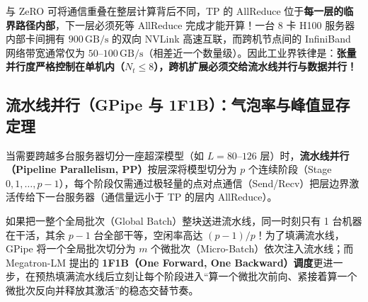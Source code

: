 \begin{remark}
与 ZeRO 可将通信重叠在整层计算背后不同，TP 的 AllReduce 位于\textbf{每一层的临界路径内部}，下一层必须死等 AllReduce 完成才能开算！一台 8 卡 H100 服务器内部卡间拥有 $900\,\mathrm{GB/s}$ 的双向 NVLink 高速互联，而跨机节点间的 InfiniBand 网络带宽通常仅为 $50\text{--}100\,\mathrm{GB/s}$（相差近一个数量级）。因此工业界铁律是：\textbf{张量并行度严格控制在单机内（$N_t \le 8$），跨机扩展必须交给流水线并行与数据并行！}
\end{remark}

\subsection{流水线并行（GPipe 与 1F1B）：气泡率与峰值显存定理}
\label{subsec:pipeline-parallel}

当需要跨越多台服务器切分一座超深模型（如 $L = 80\text{--}126$ 层）时，\textbf{流水线并行（Pipeline Parallelism, PP）}按层深将模型切分为 $p$ 个连续阶段（Stage $0, 1, \dots, p-1$），每个阶段仅需通过极轻量的点对点通信（Send/Recv）把层边界激活传给下一台服务器（通信量远小于 TP 的层内 AllReduce）。

如果把一整个全局批次（Global Batch）整块送进流水线，同一时刻只有 1 台机器在干活，其余 $p-1$ 台全部干等，空闲率高达 $(p-1)/p$！为了填满流水线，GPipe 将一个全局批次切分为 $m$ 个微批次（Micro-Batch）依次注入流水线；而 Megatron-LM 提出的 \textbf{1F1B（One Forward, One Backward）调度}更进一步，在预热填满流水线后立刻让每个阶段进入“算一个微批次前向、紧接着算一个微批次反向并释放其激活”的稳态交替节奏。

